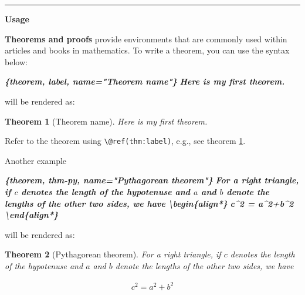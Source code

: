 \documentclass[
]{book}
\newenvironment{Shaded}{\begin{snugshade}}{\end{snugshade}}
\newcommand{\InformationTok}[1]{\textcolor[rgb]{0.56,0.35,0.01}{\textbf{\textit{#1}}}}
\newtheorem{theorem}{Theorem}[chapter]
\theoremstyle{definition}
\theoremstyle{definition}
\theoremstyle{definition}
\theoremstyle{definition}
\theoremstyle{remark}
\begin{document}
\begin{center}\rule{0.5\linewidth}{0.5pt}\end{center}

\textbf{Usage}

\textbf{Theorems and proofs} provide environments that are commonly used within articles and books in mathematics. To write a theorem, you can use the syntax below:

\begin{Shaded}
\begin{Highlighting}[]
\InformationTok{\textasciigrave{}\textasciigrave{}\textasciigrave{}\{theorem, label, name="Theorem name"\}}
\InformationTok{Here is my first theorem.}
\InformationTok{\textasciigrave{}\textasciigrave{}\textasciigrave{}}
\end{Highlighting}
\end{Shaded}

will be rendered as:

\begin{theorem}[Theorem name]
\protect\hypertarget{thm:label}{}\label{thm:label}Here is my first theorem.
\end{theorem}

Refer to the theorem using \texttt{\textbackslash{}@ref(thm:label)}, e.g., see theorem \ref{thm:label}.

Another example

\begin{Shaded}
\begin{Highlighting}[]
\InformationTok{\textasciigrave{}\textasciigrave{}\textasciigrave{}\{theorem, thm{-}py, name="Pythagorean theorem"\}}
\InformationTok{For a right triangle, if $c$ denotes the length of the hypotenuse and $a$ and $b$ denote the lengths of the other two sides, we have}
\InformationTok{  }
\InformationTok{  \textbackslash{}begin\{align*\}}
\InformationTok{  c\^{}2 = a\^{}2+b\^{}2}
\InformationTok{  \textbackslash{}end\{align*\}}
\InformationTok{\textasciigrave{}\textasciigrave{}\textasciigrave{}}
\end{Highlighting}
\end{Shaded}

will be rendered as:

\begin{theorem}[Pythagorean theorem]
\protect\hypertarget{thm:thm-py}{}\label{thm:thm-py}For a right triangle, if \(c\) denotes the length of the hypotenuse and \(a\) and \(b\) denote the lengths of the other two sides, we have

\begin{align*}
  c^2 = a^2+b^2
  \end{align*}
\end{theorem}
\end{document}
